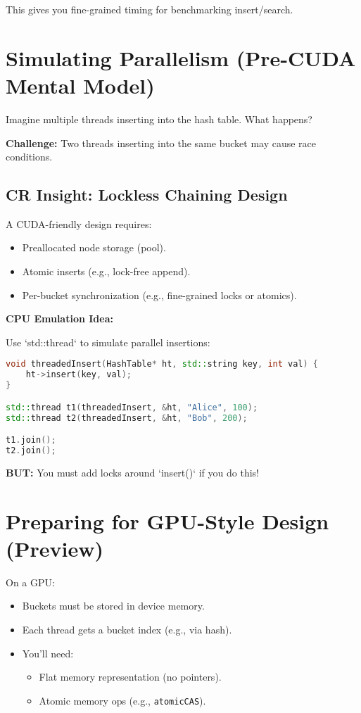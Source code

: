 \documentclass{article}
\begin{document}
This gives you fine-grained timing for benchmarking insert/search.

\section*{Simulating Parallelism (Pre-CUDA Mental Model)}

Imagine multiple threads inserting into the hash table. What happens?

\textbf{Challenge:} Two threads inserting into the same bucket may cause race conditions.

\subsection*{CR Insight: Lockless Chaining Design}
A CUDA-friendly design requires:

\begin{itemize}
    \item Preallocated node storage (pool).
    \item Atomic inserts (e.g., lock-free append).
    \item Per-bucket synchronization (e.g., fine-grained locks or atomics).
\end{itemize}

\textbf{CPU Emulation Idea:}

Use `std::thread` to simulate parallel insertions:

\begin{lstlisting}[language=C++]
void threadedInsert(HashTable* ht, std::string key, int val) {
    ht->insert(key, val);
}

std::thread t1(threadedInsert, &ht, "Alice", 100);
std::thread t2(threadedInsert, &ht, "Bob", 200);

t1.join();
t2.join();
\end{lstlisting}

\textbf{BUT:} You must add locks around `insert()` if you do this!

\section*{Preparing for GPU-Style Design (Preview)}

On a GPU:
\begin{itemize}
    \item Buckets must be stored in device memory.
    \item Each thread gets a bucket index (e.g., via hash).
    \item You’ll need:
        \begin{itemize}
            \item Flat memory representation (no pointers).
            \item Atomic memory ops (e.g., \texttt{atomicCAS}).
        \end{itemize}
\end{itemize}
\end{document}
